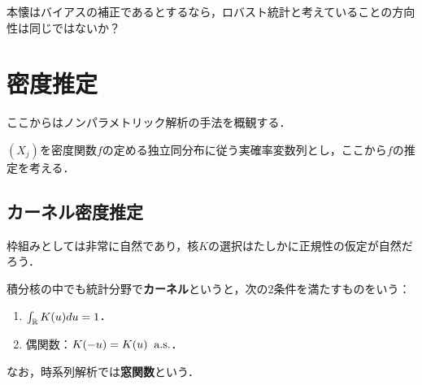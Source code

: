 \documentclass[uplatex,dvipdfmx]{jsreport}
\begin{document}
\begin{remarks}
    本懐はバイアスの補正であるとするなら，ロバスト統計と考えていることの方向性は同じではないか？
\end{remarks}

\section{密度推定}

\begin{tcolorbox}[colframe=ForestGreen, colback=ForestGreen!10!white,breakable,colbacktitle=ForestGreen!40!white,coltitle=black,fonttitle=\bfseries\sffamily,
title=]
    ここからはノンパラメトリック解析の手法を概観する．
\end{tcolorbox}

\begin{notation}
    $(X_j)$を密度関数$f$の定める独立同分布に従う実確率変数列とし，ここから$f$の推定を考える．
\end{notation}

\subsection{カーネル密度推定}

\begin{tcolorbox}[colframe=ForestGreen, colback=ForestGreen!10!white,breakable,colbacktitle=ForestGreen!40!white,coltitle=black,fonttitle=\bfseries\sffamily,
title=]
    枠組みとしては非常に自然であり，核$K$の選択はたしかに正規性の仮定が自然だろう．
\end{tcolorbox}

\begin{definition}
    積分核の中でも統計分野で\textbf{カーネル}というと，次の2条件を満たすものをいう：
    \begin{enumerate}
        \item $\int_{\mathbb{R}} K(u)du=1$．
        \item 偶関数：$K(-u)=K(u)\;\;\mathrm{a.s.}$．
    \end{enumerate}
    なお，時系列解析では\textbf{窓関数}という．
\end{definition}
\end{document}
